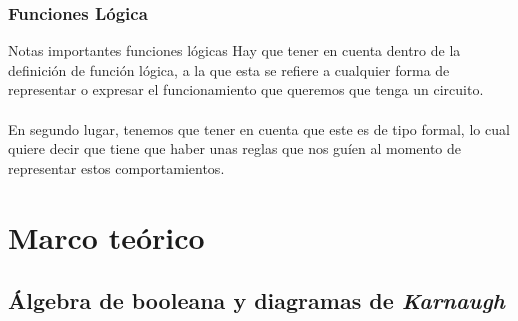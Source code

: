 \documentclass[aspectratio=169]{beamer}
\begin{document}
\begin{frame}
\frametitle{Funciones Lógica}
\begin{block}{Notas importantes funciones lógicas}
Hay que tener en cuenta dentro de la definición de función lógica, a la que \alert{esta se refiere a cualquier forma de representar o expresar el funcionamiento que queremos que tenga un circuito}.\\
\hspace{2px}
\\En segundo lugar, tenemos que tener en cuenta que este es de tipo formal, \alert{lo cual quiere decir que tiene que haber unas reglas que nos guíen al momento de representar estos comportamientos}.
\end{block}
\end{frame}

\section{Marco teórico}

\subsection{Álgebra de booleana y diagramas de \textit{Karnaugh}}
\end{document}
